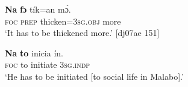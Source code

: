 \ea%
    \label{ex:key:1353}
    \gll \textbf{Na}  \textbf{fɔ} tík=an      mɔ́.\\
\textsc{foc}  \textsc{prep}  thicken=\textsc{3sg.obj}  more\\

\glt ‘It has to be thickened more.’ [dj07ae 151]
\z


\ea%
    \label{ex:key:1354}
    \gll \textbf{Na}  \textbf{to} inicia  ín.\\
\textsc{foc}  to  initiate  \textsc{3sg.indp}\\

\glt ‘He has to be initiated [to social life in Malabo].’
\z


